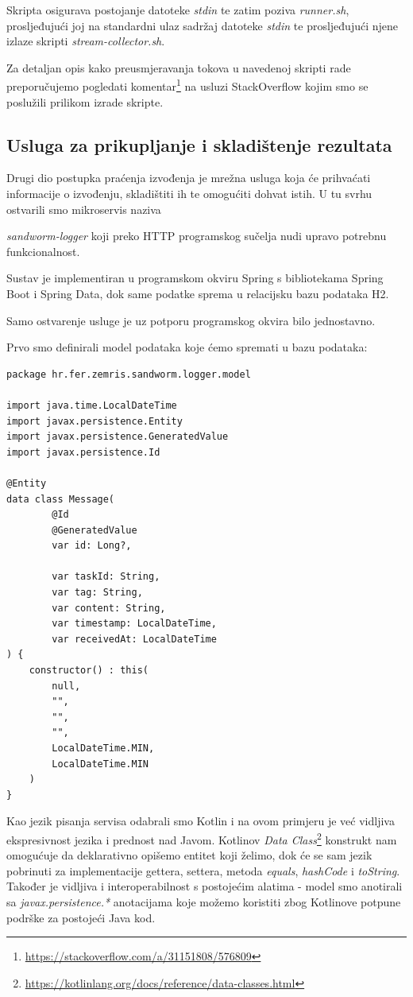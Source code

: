 \documentclass[times, utf8, zavrsni]{fer}
\begin{document}
Skripta osigurava postojanje datoteke {\textit{stdin}} te zatim poziva {\textit{runner.sh}}, prosljeđujući joj na standardni ulaz sadržaj datoteke {\textit{stdin}} te prosljeđujući njene izlaze skripti {\textit{stream-collector.sh}}.

Za detaljan opis kako preusmjeravanja tokova u navedenoj skripti rade preporučujemo pogledati komentar{\footnote{\url{https://stackoverflow.com/a/31151808/576809}}} na usluzi StackOverflow kojim smo se poslužili prilikom izrade skripte.

\subsection{Usluga za prikupljanje i skladištenje rezultata}

Drugi dio postupka praćenja izvođenja je mrežna usluga koja će prihvaćati informacije o izvođenju, skladištiti ih te omogućiti dohvat istih. U tu svrhu ostvarili smo mikroservis naziva {\textit{sandworm-logger} koji preko HTTP programskog sučelja nudi upravo potrebnu funkcionalnost.

Sustav je implementiran u programskom okviru Spring s bibliotekama Spring Boot i Spring Data, dok same podatke sprema u relacijsku bazu podataka H2.

Samo ostvarenje usluge je uz potporu programskog okvira bilo jednostavno.

Prvo smo definirali model podataka koje ćemo spremati u bazu podataka:

\begin{lstlisting}
package hr.fer.zemris.sandworm.logger.model

import java.time.LocalDateTime
import javax.persistence.Entity
import javax.persistence.GeneratedValue
import javax.persistence.Id

@Entity
data class Message(
        @Id
        @GeneratedValue
        var id: Long?,

        var taskId: String,
        var tag: String,
        var content: String,
        var timestamp: LocalDateTime,
        var receivedAt: LocalDateTime
) {
    constructor() : this(
	 	null,
		"",
		"",
		"",
		LocalDateTime.MIN,
		LocalDateTime.MIN
	)
}
\end{lstlisting}

Kao jezik pisanja servisa odabrali smo Kotlin i na ovom primjeru je već vidljiva ekspresivnost jezika i prednost nad Javom. Kotlinov {\textit{Data Class}}{\footnote{\url{https://kotlinlang.org/docs/reference/data-classes.html}}} konstrukt nam omogućuje da deklarativno opišemo entitet koji želimo, dok će se sam jezik pobrinuti za implementacije gettera, settera, metoda {\textit{equals}}, {\textit{hashCode}} i {\textit{toString}}. Također je vidljiva i interoperabilnost s postojećim alatima - model smo anotirali sa {\textit{javax.persistence.*}} anotacijama koje možemo koristiti zbog Kotlinove potpune podrške za postojeći Java kod.


}
\end{document}
